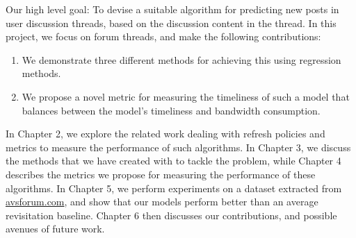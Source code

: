 Our high level goal: To devise a suitable algorithm for predicting new posts in 
user discussion threads, based on the discussion content in the thread. In this 
project, we focus on forum threads, and make the following contributions:
\begin{enumerate}
	\item We demonstrate three different methods for achieving this using 
regression methods.
	\item We propose a novel metric for measuring the timeliness of such a model 
that balances between the model's timeliness and bandwidth consumption.
\end{enumerate}

In Chapter 2, we explore the related work dealing with refresh policies and 
metrics to measure the performance of such algorithms. In Chapter 3, we discuss 
the methods that we have created with to tackle the problem, while Chapter 4 
describes the metrics we propose for measuring the performance of these 
algorithms.  In Chapter 5, we perform experiments on a dataset extracted from 
\url{avsforum.com}, 
and show that our models perform better than 
an average revisitation baseline. Chapter 6 then discusses our contributions, 
and possible avenues of future work.
